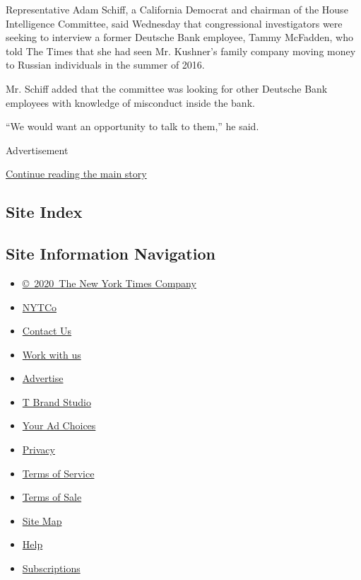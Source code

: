 Representative Adam Schiff, a California Democrat and chairman of the
House Intelligence Committee, said Wednesday that congressional
investigators were seeking to interview a former Deutsche Bank employee,
Tammy McFadden, who told The Times that she had seen Mr. Kushner's
family company moving money to Russian individuals in the summer of
2016.

Mr. Schiff added that the committee was looking for other Deutsche Bank
employees with knowledge of misconduct inside the bank.

``We would want an opportunity to talk to them,'' he said.

Advertisement

\protect\hyperlink{after-bottom}{Continue reading the main story}

\hypertarget{site-index}{%
\subsection{Site Index}\label{site-index}}

\hypertarget{site-information-navigation}{%
\subsection{Site Information
Navigation}\label{site-information-navigation}}

\begin{itemize}
\tightlist
\item
  \href{https://help.nytimes.com/hc/en-us/articles/115014792127-Copyright-notice}{©~2020~The
  New York Times Company}
\end{itemize}

\begin{itemize}
\tightlist
\item
  \href{https://www.nytco.com/}{NYTCo}
\item
  \href{https://help.nytimes.com/hc/en-us/articles/115015385887-Contact-Us}{Contact
  Us}
\item
  \href{https://www.nytco.com/careers/}{Work with us}
\item
  \href{https://nytmediakit.com/}{Advertise}
\item
  \href{http://www.tbrandstudio.com/}{T Brand Studio}
\item
  \href{https://www.nytimes.com/privacy/cookie-policy\#how-do-i-manage-trackers}{Your
  Ad Choices}
\item
  \href{https://www.nytimes.com/privacy}{Privacy}
\item
  \href{https://help.nytimes.com/hc/en-us/articles/115014893428-Terms-of-service}{Terms
  of Service}
\item
  \href{https://help.nytimes.com/hc/en-us/articles/115014893968-Terms-of-sale}{Terms
  of Sale}
\item
  \href{https://spiderbites.nytimes.com}{Site Map}
\item
  \href{https://help.nytimes.com/hc/en-us}{Help}
\item
  \href{https://www.nytimes.com/subscription?campaignId=37WXW}{Subscriptions}
\end{itemize}
